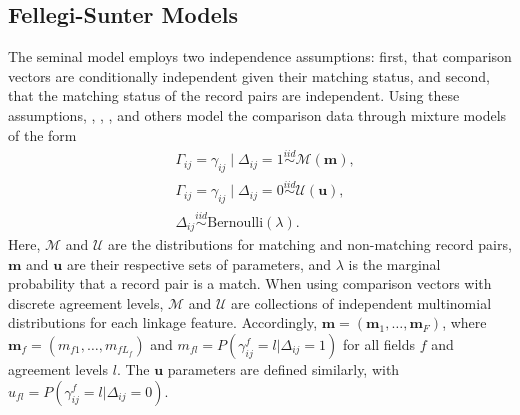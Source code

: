 \documentclass[ba]{imsart}
\begin{document}
{
}


%

\subsection{Fellegi-Sunter Models}
\label{fellegi-sunter}

The seminal \cite{fellegi_theory_1969} model employs two independence assumptions: first, that comparison vectors are conditionally independent given their matching status, and second, that the matching status of the record pairs are independent. Using these assumptions, \cite{winkler_state_1999}, \cite{jaro1989}, \cite{larsen_2001}, \cite{enamorado2019using} and others model the comparison data through mixture models of the form
\begin{subequations}
\begin{align}
	&\Gamma_{ij} = \gamma_{ij} \mid \Delta_{ij} = 1 \stackrel{iid}{\sim} \mathcal{M}(\bm{m}), \label{eqn:fs_model} \\
	&\Gamma_{ij} = \gamma_{ij} \mid \Delta_{ij} = 0  \stackrel{iid}{\sim} \mathcal{U}(\bm{u}), \label{eqn:m_dist}\\
	&\Delta_{ij}   \stackrel{iid}{\sim} \text{Bernoulli}(\lambda). \label{eqn:u_dist}
\end{align}
\end{subequations}
Here, $\mathcal{M}$ and $\mathcal{U}$ are the distributions for matching and non-matching record pairs, $\bm{m}$ and $\bm{u}$ are their respective sets of parameters, and $\lambda$ is the marginal probability that a record pair is a match. When using comparison vectors with discrete agreement levels, $\mathcal{M}$ and $\mathcal{U}$ are collections of independent multinomial distributions for each linkage feature. Accordingly, $\bm{m} = (\bm{m}_1, \ldots, \bm{m}_F)$, where $\bm{m}_f = (m_{f1}, \ldots, m_{fL_f})$ and $m_{fl} = P(\gamma_{ij}^f = l|\Delta_{ij} = 1)$ for all fields $f$ and agreement levels $l$. The $\bm{u}$ parameters are defined similarly, with $u_{fl} = P(\gamma_{ij}^f = l|\Delta_{ij} = 0)$.
\end{document}
